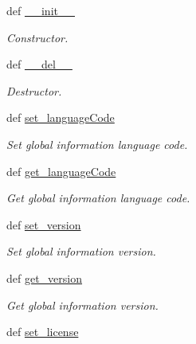 \begin{DoxyCompactItemize}
\item 
def \hyperlink{classlmf_1_1src_1_1core_1_1global__information_1_1_global_information_a8815a24e93798f1e253ba79ec38cb30f}{\+\_\+\+\_\+init\+\_\+\+\_\+}
\begin{DoxyCompactList}\small\item\em Constructor. \end{DoxyCompactList}\item 
def \hyperlink{classlmf_1_1src_1_1core_1_1global__information_1_1_global_information_a9ef2d1611e39e6d3802651da2b46ef1c}{\+\_\+\+\_\+del\+\_\+\+\_\+}
\begin{DoxyCompactList}\small\item\em Destructor. \end{DoxyCompactList}\item 
def \hyperlink{classlmf_1_1src_1_1core_1_1global__information_1_1_global_information_a3977a05f9b005533e993289ccf3f75e5}{set\+\_\+language\+Code}
\begin{DoxyCompactList}\small\item\em Set global information language code. \end{DoxyCompactList}\item 
def \hyperlink{classlmf_1_1src_1_1core_1_1global__information_1_1_global_information_ae5a42841bcbd4362e6921b0e7e35aa6d}{get\+\_\+language\+Code}
\begin{DoxyCompactList}\small\item\em Get global information language code. \end{DoxyCompactList}\item 
def \hyperlink{classlmf_1_1src_1_1core_1_1global__information_1_1_global_information_ab2d8710b5935482e14d2df75acfc1004}{set\+\_\+version}
\begin{DoxyCompactList}\small\item\em Set global information version. \end{DoxyCompactList}\item 
def \hyperlink{classlmf_1_1src_1_1core_1_1global__information_1_1_global_information_a931368ccd7306bde82ad496b2f99827b}{get\+\_\+version}
\begin{DoxyCompactList}\small\item\em Get global information version. \end{DoxyCompactList}\item 
def \hyperlink{classlmf_1_1src_1_1core_1_1global__information_1_1_global_information_a09e363eee8adb3b945422385e7d3b576}{set\+\_\+license}

\end{DoxyCompactItemize}
